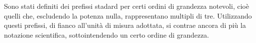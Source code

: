 \noindent Sono stati definiti dei prefissi stadard per certi ordini di grandezza notevoli,
cioè quelli che, escludendo la potenza nulla, rappresentano multipli di tre.
Utilizzando questi prefissi, di fianco all'unità di misura adottata, si contrae
ancora di più la notazione scientifica, sottointendendo un certo ordine di
grandezza.



